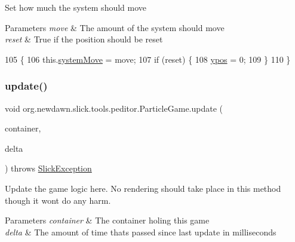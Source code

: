 Set how much the system should move


\begin{DoxyParams}{Parameters}
{\em move} & The amount of the system should move \\
\hline
{\em reset} & True if the position should be reset \\
\hline
\end{DoxyParams}

\begin{DoxyCode}
105                                                        \{
106         this.\mbox{\hyperlink{classorg_1_1newdawn_1_1slick_1_1tools_1_1peditor_1_1_particle_game_a31cd56ce3d166fe6e01d7423b11f31c9}{systemMove}} = move;
107         \textcolor{keywordflow}{if} (reset) \{
108             \mbox{\hyperlink{classorg_1_1newdawn_1_1slick_1_1tools_1_1peditor_1_1_particle_game_af74ce521a4625f8b66b8e7e54ba3b2e4}{ypos}} = 0;
109         \}
110     \}
\end{DoxyCode}
\mbox{\label{classorg_1_1newdawn_1_1slick_1_1tools_1_1peditor_1_1_particle_game_ae7a6cbca46bc737863738c8ff781f71c}} 
\subsubsection{\texorpdfstring{update()}{update()}}
{\footnotesize\ttfamily void org.\+newdawn.\+slick.\+tools.\+peditor.\+Particle\+Game.\+update (\begin{DoxyParamCaption}\item[{\mbox{\hyperlink{classorg_1_1newdawn_1_1slick_1_1_game_container}{Game\+Container}}}]{container,  }\item[{int}]{delta }\end{DoxyParamCaption}) throws \mbox{\hyperlink{classorg_1_1newdawn_1_1slick_1_1_slick_exception}{Slick\+Exception}}\hspace{0.3cm}{\ttfamily [inline]}}

Update the game logic here. No rendering should take place in this method though it won\textquotesingle{}t do any harm.


\begin{DoxyParams}{Parameters}
{\em container} & The container holing this game \\
\hline
{\em delta} & The amount of time thats passed since last update in milliseconds \\
\hline
\end{DoxyParams}

